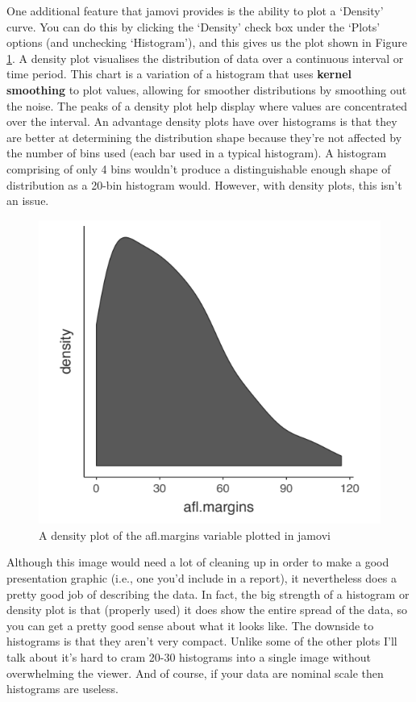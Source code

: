 \documentclass[
]{book}
\begin{document}
One additional feature that jamovi provides is the ability to plot a `Density' curve. You can do this by clicking the `Density' check box under the `Plots' options (and unchecking `Histogram'), and this gives us the plot shown in Figure \ref{fig:fig5-3}. A density plot visualises the distribution of data over a continuous interval or time period. This chart is a variation of a histogram that uses \textbf{kernel smoothing} to plot values, allowing for smoother distributions by smoothing out the noise. The peaks of a density plot help display where values are concentrated over the interval. An advantage density plots have over histograms is that they are better at determining the distribution shape because they're not affected by the number of bins used (each bar used in a typical histogram). A histogram comprising of only 4 bins wouldn't produce a distinguishable enough shape of distribution as a 20-bin histogram would. However, with density plots, this isn't an issue.

\begin{figure}
\includegraphics[width=0.9\linewidth]{images/Figure24} \caption{A density plot of the afl.margins variable plotted in jamovi}\label{fig:fig5-3}
\end{figure}

Although this image would need a lot of cleaning up in order to make a good presentation graphic (i.e., one you'd include in a report), it nevertheless does a pretty good job of describing the data. In fact, the big strength of a histogram or density plot is that (properly used) it does show the entire spread of the data, so you can get a pretty good sense about what it looks like. The downside to histograms is that they aren't very compact. Unlike some of the other plots I'll talk about it's hard to cram 20-30 histograms into a single image without overwhelming the viewer. And of course, if your data are nominal scale then histograms are useless.
\end{document}
